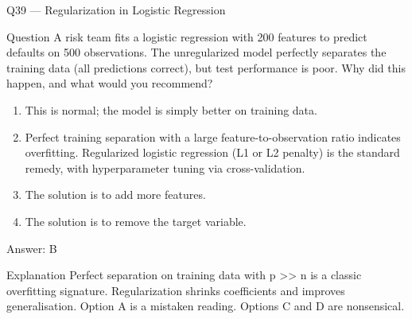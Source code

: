 \documentclass[aspectratio=169,8pt]{beamer}
\begin{document}
	\begin{frame}{Q39 --- Regularization in Logistic Regression}
		\begin{block}{Question}
			A risk team fits a logistic regression with 200 features to predict defaults on 500 observations. The unregularized model perfectly separates the training data (all predictions correct), but test performance is poor. Why did this happen, and what would you recommend?
		\end{block}
		\begin{enumerate}
			\item This is normal; the model is simply better on training data.
			\item Perfect training separation with a large feature-to-observation ratio indicates overfitting. Regularized logistic regression (L1 or L2 penalty) is the standard remedy, with hyperparameter tuning via cross-validation.
			\item The solution is to add more features.
			\item The solution is to remove the target variable.
		\end{enumerate}
		\begin{exampleblock}{Answer: B}\end{exampleblock}
		\begin{block}{Explanation}
			Perfect separation on training data with p >> n is a classic overfitting signature. Regularization shrinks coefficients and improves generalisation. Option A is a mistaken reading. Options C and D are nonsensical.
		\end{block}
	\end{frame}
\end{document}
